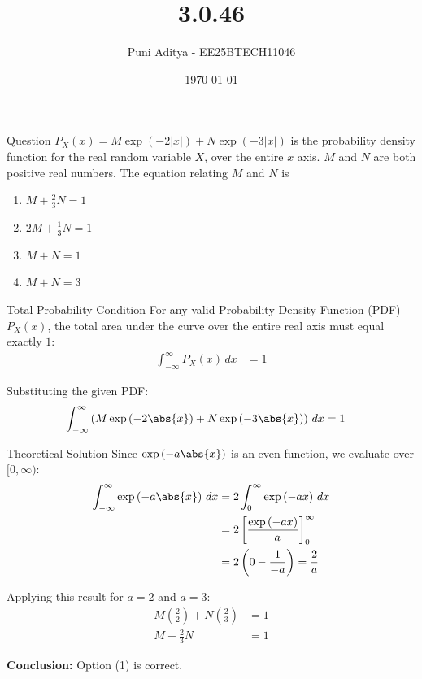 \documentclass{beamer}
\title{3.0.46}
\author{Puni Aditya - EE25BTECH11046}
\date{\today}
\providecommand{\brak}[1]{\ensuremath{\left(#1\right)}}
\providecommand{\sbrak}[1]{\ensuremath{\left[#1\right]}}
\begin{document}
\begin{frame}
\titlepage
\end{frame}

\begin{frame}{Question}
$P_X(x) = M\exp(-2|x|) + N\exp(-3|x|)$ is the probability density function for the real random variable $X$, over the entire $x$ axis. $M$ and $N$ are both positive real numbers. The equation relating $M$ and $N$ is
\begin{enumerate}
    \item $M + \frac{2}{3} N = 1$
    \item $2M + \frac{1}{3}N = 1$
    \item $M + N = 1$
    \item $M + N = 3$
\end{enumerate}
\end{frame}

\begin{frame}{Total Probability Condition}
For any valid Probability Density Function (PDF) $P_X(x)$, the total area under the curve over the entire real axis must equal exactly $1$:
\begin{align}
    \int_{-\infty}^{\infty} P_X(x) \, dx &= 1
\end{align}

Substituting the given PDF:
\begin{align}
    \int_{-\infty}^{\infty} \brak{M\exp\brak{-2\abs{x}} + N\exp\brak{-3\abs{x}}} \, dx &= 1
\end{align}
\end{frame}

\begin{frame}{Theoretical Solution}
Since $\exp\brak{-a\abs{x}}$ is an even function, we evaluate over $[0, \infty)$:
\begin{align}
    \int_{-\infty}^{\infty} \exp\brak{-a\abs{x}} \, dx &= 2 \int_{0}^{\infty} \exp\brak{-ax} \, dx \\
    &= 2 \sbrak{\frac{\exp\brak{-ax}}{-a}}_0^\infty \\
    &= 2 \brak{0 - \frac{1}{-a}} = \frac{2}{a}
\end{align}

Applying this result for $a=2$ and $a=3$:
\begin{align}
    M\brak{\frac{2}{2}} + N\brak{\frac{2}{3}} &= 1 \\
    M + \frac{2}{3}N &= 1
\end{align}

\textbf{Conclusion:} Option (1) is correct.
\end{frame}
\end{document}
